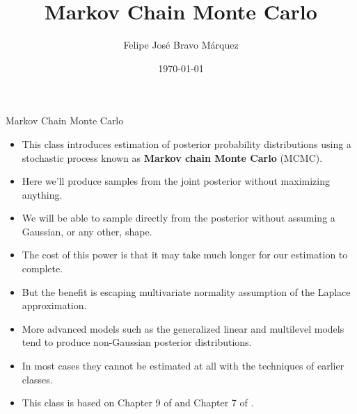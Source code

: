 \documentclass[handout]{beamer}
\title{Markov Chain Monte Carlo}
\author[Felipe Bravo Márquez]{\footnotesize
 \textcolor[rgb]{0.00,0.00,1.00}{Felipe José Bravo Márquez}}
\date{ \today }
\begin{document}
\begin{frame}
\titlepage


\end{frame}




\begin{frame}{Markov Chain Monte Carlo}
\scriptsize{
\begin{itemize}
\item This class  introduces estimation of posterior probability distributions using a stochastic process known
as \textbf{Markov chain Monte Carlo} (MCMC). 

\item Here we'll produce samples from the joint posterior without maximizing anything. 

\item We will be able to sample directly from the posterior without assuming a Gaussian, or any other, shape. 

\item The cost of this power is that it may take much longer for our estimation to complete.

\item But the benefit is escaping multivariate normality assumption of the Laplace approximation.

\item More advanced models such as the generalized linear and multilevel models tend to produce non-Gaussian posterior distributions.

\item In most cases  they cannot
be estimated at all with the techniques of earlier classes. 


\item This class is based on Chapter 9 of \cite{mcelreath2020statistical} and Chapter 7 of \cite{kruschke2014doing}.
 
\end{itemize}



} 

\end{frame}
\end{document}
